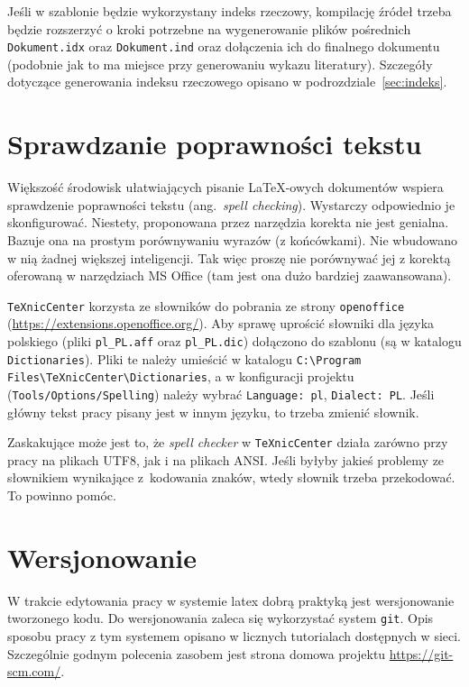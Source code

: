 Jeśli w szablonie będzie wykorzystany indeks rzeczowy, kompilację źródeł trzeba będzie rozszerzyć o kroki potrzebne na wygenerowanie plików pośrednich \texttt{Dokument.idx} oraz \texttt{Dokument.ind} oraz dołączenia ich do finalnego dokumentu (podobnie jak to ma miejsce przy generowaniu wykazu literatury).
Szczegóły dotyczące generowania indeksu rzeczowego opisano w podrozdziale~\ref{sec:indeks}.

\section{Sprawdzanie poprawności tekstu}
Większość środowisk ułatwiających pisanie \LaTeX-owych dokumentów wspiera sprawdzenie poprawności tekstu (ang.~\emph{spell checking}). Wystarczy odpowiednio je skonfigurować. Niestety, proponowana przez narzędzia korekta nie jest genialna. Bazuje ona na prostym porównywaniu wyrazów (z końcówkami). Nie wbudowano w nią żadnej większej inteligencji. Tak więc proszę nie porównywać jej z korektą oferowaną w narzędziach MS Office (tam jest ona dużo bardziej zaawansowana).

\texttt{TeXnicCenter} korzysta ze słowników do pobrania ze strony \texttt{openoffice} (\url{https://extensions.openoffice.org/}).
Aby sprawę uprościć słowniki dla języka polskiego (pliki \texttt{pl\_PL.aff} oraz \texttt{pl\_PL.dic}) dołączono do szablonu (są w katalogu \texttt{Dictionaries}). Pliki te należy umieścić w katalogu \texttt{C:\textbackslash{}Program Files\textbackslash{}TeXnicCenter\textbackslash{}Dictionaries}, a w konfiguracji projektu (\texttt{Tools/Options/Spelling}) należy wybrać \texttt{Language: pl}, \texttt{Dialect: PL}. Jeśli główny tekst pracy pisany jest w innym języku, to trzeba zmienić słownik.

Zaskakujące może jest to, że \emph{spell checker} w \texttt{TeXnicCenter} działa zarówno przy pracy na plikach UTF8, jak i na plikach ANSI. Jeśli byłyby jakieś problemy ze słownikiem wynikające z~kodowania znaków, wtedy słownik trzeba przekodować. To powinno pomóc.

\section{Wersjonowanie}
W trakcie edytowania pracy w systemie latex dobrą praktyką jest wersjonowanie tworzonego kodu. Do wersjonowania zaleca się wykorzystać system \texttt{git}. Opis sposobu pracy z tym systemem opisano w licznych tutorialach dostępnych w sieci. Szczególnie godnym polecenia zasobem jest strona domowa projektu \url{https://git-scm.com/}.

